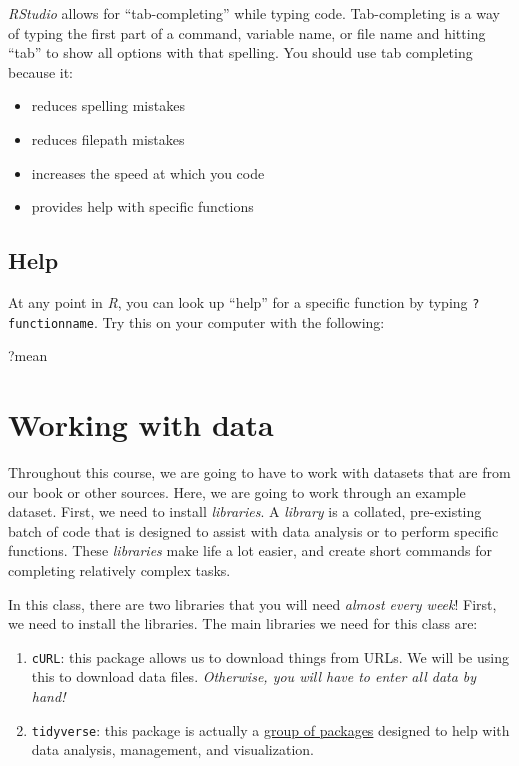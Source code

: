 \documentclass[
  letterpaper,
  DIV=11,
  numbers=noendperiod]{scrreprt}
\newenvironment{Shaded}{\begin{snugshade}}{\end{snugshade}}
\newcommand{\NormalTok}[1]{\textcolor[rgb]{0.00,0.23,0.31}{#1}}
\providecommand{\tightlist}{%
  \setlength{\itemsep}{0pt}\setlength{\parskip}{0pt}}\usepackage{longtable,booktabs,array}
\begin{document}
\emph{RStudio} allows for ``tab-completing'' while typing code.
Tab-completing is a way of typing the first part of a command, variable
name, or file name and hitting ``tab'' to show all options with that
spelling. You should use tab completing because it:

\begin{itemize}
\tightlist
\item
  reduces spelling mistakes
\item
  reduces filepath mistakes
\item
  increases the speed at which you code
\item
  provides help with specific functions
\end{itemize}

\section{Help}\label{help}

At any point in \emph{R}, you can look up ``help'' for a specific
function by typing \texttt{?functionname}. Try this on your computer
with the following:

\begin{Shaded}
\begin{Highlighting}[]
\NormalTok{?mean}
\end{Highlighting}
\end{Shaded}


\chapter{Working with data}\label{working-with-data}

Throughout this course, we are going to have to work with datasets that
are from our book or other sources. Here, we are going to work through
an example dataset. First, we need to install \emph{libraries}. A
\emph{library} is a collated, pre-existing batch of code that is
designed to assist with data analysis or to perform specific functions.
These \emph{libraries} make life a lot easier, and create short commands
for completing relatively complex tasks.

In this class, there are two libraries that you will need \emph{almost
every week}! First, we need to install the libraries. The main libraries
we need for this class are:

\begin{enumerate}
\def\labelenumi{\arabic{enumi}.}
\tightlist
\item
  \texttt{cURL}: this package allows us to download things from URLs. We
  will be using this to download data files. \emph{Otherwise, you will
  have to enter all data by hand!}
\item
  \texttt{tidyverse}: this package is actually a
  \href{https://www.tidyverse.org/}{group of packages} designed to help
  with data analysis, management, and visualization.
\end{enumerate}
\end{document}
